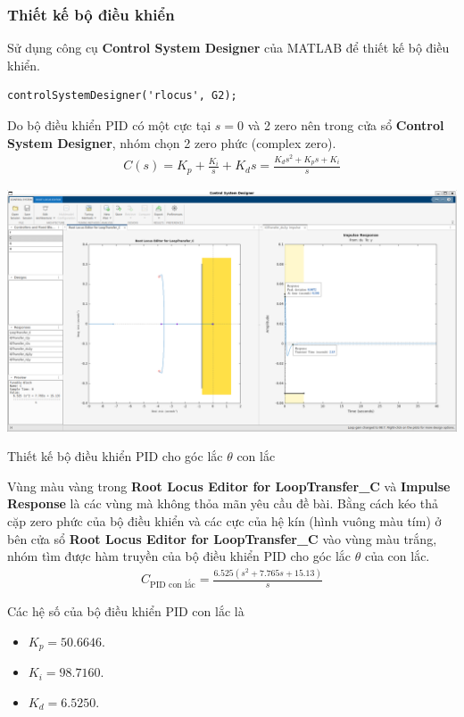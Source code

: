 \documentclass[12pt,a4paper]{article}
\begin{document}
\subsubsection{Thiết kế bộ điều khiển}

Sử dụng công cụ \textbf{Control System Designer} của MATLAB để thiết kế bộ điều khiển. 
\begin{lstlisting}[style=matlabstyle,caption=Thiết kế bộ điều khiển PID cho hàm truyền $G_2(s)$]
controlSystemDesigner('rlocus', G2);
\end{lstlisting}

Do bộ điều khiển PID có một cực tại $s=0$ và 2 zero nên trong cửa sổ \textbf{Control System Designer}, nhóm chọn 2 zero phức (complex zero). 
\begin{align}
    C(s) = K_p + \frac{K_i}{s} + K_ds = \frac{K_ds^2 + K_ps +K_i}{s}
\end{align}

\begin{center}
    \captionsetup{type=figure}
    \includegraphics[width=\linewidth]{thiet_ke_PID_con_lac.png}
    \caption{Thiết kế bộ điều khiển PID cho góc lắc $\theta$ con lắc}
\end{center}

Vùng màu vàng trong \textbf{Root Locus Editor for LoopTransfer\_C} và  \textbf{Impulse Response} là các vùng mà không thỏa mãn yêu cầu đề bài. Bằng cách kéo thả cặp zero phức của bộ điều khiển và các cực của hệ kín (hình vuông màu tím) ở bên cửa sổ \textbf{Root Locus Editor for LoopTransfer\_C} vào vùng màu trắng, nhóm tìm được hàm truyền của bộ điều khiển PID cho góc lắc $\theta$ của con lắc.
\begin{align}
    C_{\text{PID con lắc}} = \frac{6.525 (s^2 + 7.765s + 15.13)}{s}
\end{align}

Các hệ số của bộ điều khiển PID con lắc là
\begin{itemize}
    \item $K_p = 50.6646$.
    \item $K_i = 98.7160$.
    \item $K_d = 6.5250$.
\end{itemize}
\end{document}
